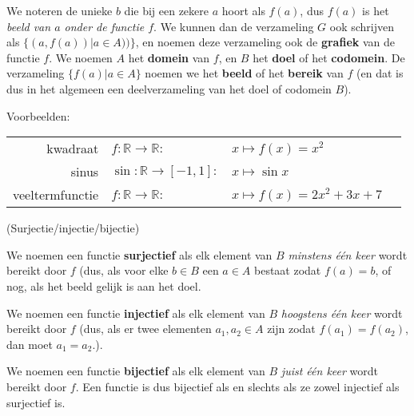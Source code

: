 \documentclass{ximera}
\begin{document}
We noteren de unieke $b$ die bij een zekere $a$ hoort als $f(a)$, dus $f(a)$ is  het \textit{beeld van $a$ onder de functie $f$}. We kunnen dan de verzameling $G$ ook schrijven als $\{(a,f(a)) | a\in A))\}$, en noemen deze verzameling ook de \textbf{grafiek} van de functie $f$. We noemen $A$ het \textbf{domein} van $f$, en $B$ het \textbf{doel} of het \textbf{codomein}. De verzameling $\{f(a) | a\in A\}$ noemen we het \textbf{beeld} of het \textbf{bereik} van $f$ (en dat is dus in het algemeen een deelverzameling van het doel of codomein $B$).


Voorbeelden:

\begin{tabular}[t]{r l l l}
kwadraat   & $f : \mathbb{R} \rightarrow \mathbb{R} :  $   & $x \mapsto  f(x) = x^2 $\\
sinus & $\sin : \mathbb{R} \rightarrow [-1,1] :    $ & $x \mapsto  \sin x $\\
veeltermfunctie & $f : \mathbb{R} \rightarrow \mathbb{R} :  $   & $x \mapsto  f(x) = 2x^2+3x+7 $\\
\end{tabular}

\begin{definition} (Surjectie/injectie/bijectie)
	
We noemen een functie \textbf{surjectief} als elk element van $B$ \textit{minstens één keer} wordt bereikt door $f$ (dus, als voor elke $b \in B$ een $a\in A$ bestaat zodat $f(a) = b$, of nog, als het beeld gelijk is aan het doel. 

We noemen een functie \textbf{injectief} als elk element van $B$ \textit{hoogstens één keer} wordt bereikt door $f$ (dus, als er twee elementen $a_1, a_2\in A$ zijn zodat $f(a_1)=f(a_2)$, dan moet $a_1=a_2$.). 

We noemen een functie \textbf{bijectief} als elk element van $B$ \textit{juist één keer} wordt bereikt door $f$. Een functie is dus bijectief als en slechts als ze zowel injectief als surjectief is. 
\end{definition}
\end{document}
